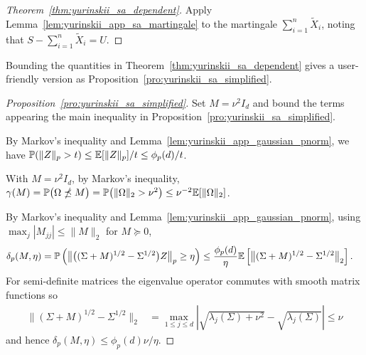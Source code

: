 \begin{proof}[Theorem~\ref{thm:yurinskii_sa_dependent}]
  Apply Lemma~\ref{lem:yurinskii_app_sa_martingale} to
  the martingale $\sum_{i=1}^{n} \tilde X_i$,
  noting that $S - \sum_{i=1}^{n} \tilde X_i = U$.
\end{proof}

Bounding the quantities
in Theorem~\ref{thm:yurinskii_sa_dependent} gives a
user-friendly version as Proposition~\ref{pro:yurinskii_sa_simplified}.

\begin{proof}[Proposition~\ref{pro:yurinskii_sa_simplified}]

  Set $M = \nu^2 I_d$ and
  bound the terms appearing
  the main inequality in Proposition~\ref{pro:yurinskii_sa_simplified}.


  By Markov's inequality and Lemma~\ref{lem:yurinskii_app_gaussian_pnorm},
  we have
  $\mathbb{P}( \|Z\|_p > t ) \leq \mathbb{E}[\|Z\|_p] / t \leq \phi_p(d) / t$.


  With $M = \nu^2 I_d$,
  by Markov's inequality,
  $\gamma(M) = \mathbb{P}\big(\Omega \npreceq M\big)
  = \mathbb{P}\big(\|\Omega\|_2 > \nu^2 \big)
  \leq \nu^{-2} \mathbb{E}[\|\Omega\|_2]$.


  By Markov's inequality and Lemma~\ref{lem:yurinskii_app_gaussian_pnorm},
  using
  $\max_j |M_{j j}| \leq \|M\|_2$
  for $M \succeq 0$,
  \begin{align*}
    \delta_{p}(M,\eta)
    &= \mathbb{P}\left(
      \big\|\big((\Sigma +M)^{1/2}- \Sigma^{1/2}\big) Z\big\|_p
      \geq \eta
    \right)
    \leq \frac{\phi_p(d)} {\eta}
    \mathbb{E} \left[
      \big\|(\Sigma +M)^{1/2}- \Sigma^{1/2}\big\|_2
    \right].
  \end{align*}
  For semi-definite matrices
  the eigenvalue operator commutes with smooth matrix functions so
  \begin{align*}
    \|(\Sigma +M)^{1/2}- \Sigma^{1/2}\|_2
    &=
    \max_{1 \leq j \leq d}
    \left|
    \sqrt{\lambda_j(\Sigma) + \nu^2} - \sqrt{\lambda_j(\Sigma)}
    \right|
    \leq \nu
  \end{align*}
  and hence $\delta_{p}(M,\eta) \leq \phi_p(d)\nu / \eta$.



\end{proof}
